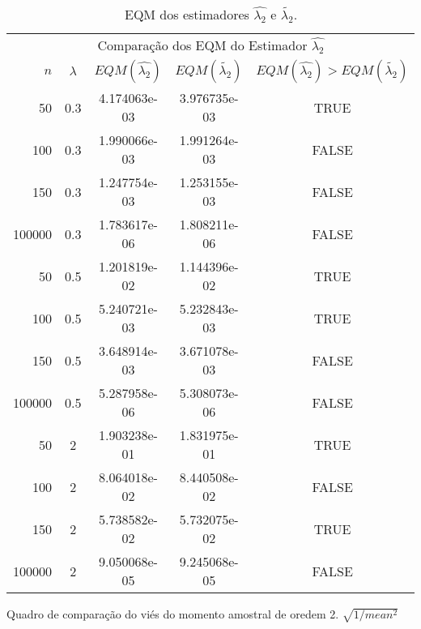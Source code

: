 \documentclass[12pt]{article}
\begin{document}
\begin{table}[H]
\caption{EQM dos estimadores $\hat{\lambda_{2}}$ e $\tilde{\lambda_{2}}$.}
\label{tab:p1EQM}
\centering
\begin{tabular}{rcccc}
\toprule
\multicolumn{5}{c}{Comparação dos EQM do Estimador $\hat{\lambda_{2}}$}\\
$n$ & $\lambda$ & $EQM(\hat{\lambda_{2}})$ & $EQM(\tilde{\lambda_{2}})$ & $EQM(\hat{\lambda_{2}})>EQM(\tilde{\lambda_{2}})$ \\
\midrule
50 & 0.3 & 4.174063e-03 & 3.976735e-03  & TRUE \\
100 & 0.3 & 1.990066e-03 & 1.991264e-03 & FALSE \\
150 & 0.3 & 1.247754e-03 & 1.253155e-03 & FALSE \\
100000 & 0.3 & 1.783617e-06 & 1.808211e-06 & FALSE \\
\midrule
50 & 0.5 & 1.201819e-02 & 1.144396e-02  & TRUE \\
100 & 0.5 &  5.240721e-03 & 5.232843e-03 & TRUE \\
150 & 0.5 &  3.648914e-03  & 3.671078e-03 & FALSE\\
100000 & 0.5 & 5.287958e-06 & 5.308073e-06 & FALSE \\
\midrule
50 & 2 & 1.903238e-01 &  1.831975e-01 & TRUE \\
100 & 2 & 8.064018e-02 &  8.440508e-02 & FALSE \\
150 & 2 & 5.738582e-02 & 5.732075e-02 & TRUE \\
100000 & 2 & 9.050068e-05 & 9.245068e-05 & FALSE \\
\bottomrule
\end{tabular}
\end{table}

Quadro de comparação do viés do momento amostral de oredem 2. $\sqrt{1/mean^2}$
\end{document}
